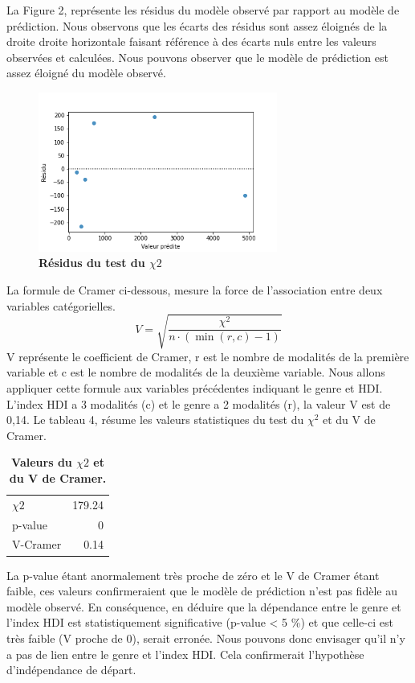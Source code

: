 \documentclass[12pt, a4paper, titlepage, table]{article}
\begin{document}
La Figure 2, représente les résidus du modèle observé par rapport au modèle de prédiction. Nous observons que les écarts des résidus sont assez éloignés de la droite droite horizontale faisant référence à des écarts nuls entre les valeurs observées et calculées. Nous pouvons observer que le modèle de prédiction est assez éloigné du modèle observé.

	\begin{figure}[H]
		\centering
		\includegraphics[width=0.7\textwidth]{../../graph/residus_chi2.png}
		\caption{\textbf{Résidus du test du $\chi2$}}
	\end{figure}


La formule de Cramer ci-dessous, mesure la force de l'association entre deux variables catégorielles.
\[ V = \sqrt{\frac{\chi^2}{n \cdot (\min(r, c) - 1)}} \]
V représente le coefficient de Cramer,  r est le nombre de modalités de la première variable et c est le nombre de modalités de la deuxième variable.
Nous allons appliquer cette formule aux variables précédentes indiquant le genre et HDI.
L'index HDI a 3 modalités (c) et le genre a 2 modalités (r), la valeur V est de 0,14.
Le tableau 4, résume les valeurs statistiques du test du $\chi^2$ et du V de Cramer.

\begin{table}[H]
	\centering
	\fontsize{12}{20}\selectfont
	\begin{tabular}{|l|r|}
		\hline  
		$\chi2$&	179.24\\
		p-value&	0\\
		V-Cramer&	0.14\\
		\hline
	\end{tabular}
	\caption{\textbf{Valeurs du $\chi2$ et du V de Cramer.}}
\end{table}

La p-value étant anormalement très proche de zéro et le V de Cramer étant faible, ces valeurs confirmeraient que le modèle de prédiction n'est pas fidèle au modèle observé. En conséquence, en déduire que la dépendance entre le genre et l'index HDI est statistiquement significative (p-value < 5 \%) et que celle-ci est très faible (V proche de 0), serait erronée. Nous pouvons donc envisager qu'il n'y a pas de lien entre le genre et l'index HDI. Cela confirmerait l'hypothèse d'indépendance de départ.
\end{document}
